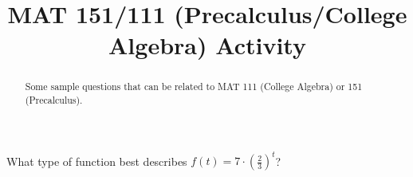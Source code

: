 \documentclass{ximera}
\title{MAT 151/111 (Precalculus/College Algebra) Activity}
\begin{document}
      
\begin{abstract}
      
Some sample questions that can be related to MAT 111 (College Algebra) or 151 (Precalculus).
      
\end{abstract}
      
\maketitle
      
      
      
\begin{question}
      
  What type of function best describes $f(t)=7\cdot\left(\frac{2}{3}\right)^t$?
      
  \begin{multipleChoice}
      
      
    
          
  \end{multipleChoice}
      
\end{question}      
\end{document}
